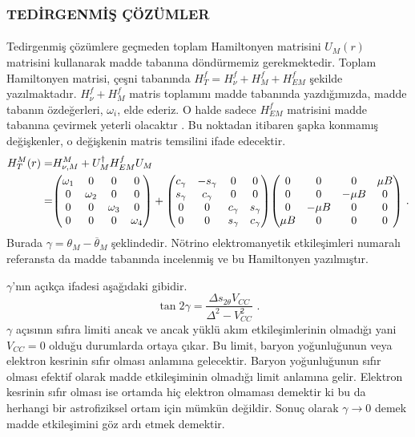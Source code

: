 \subsubsection{TEDİRGENMİŞ ÇÖZÜMLER}
\paragraph{}
Tedirgenmiş çözümlere geçmeden toplam Hamiltonyen matrisini $ U_{M}(r) $ matrisini kullanarak madde tabanına döndürmemiz gerekmektedir. Toplam Hamiltonyen matrisi, çeşni tabanında $ H^{f}_{T} = H^{f}_{\nu} + H^{f}_{M} + H^{f}_{EM} $ şekilde yazılmaktadır. $  H^{f}_{\nu} + H^{f}_{M} $ matris toplamını madde tabanında yazdığımızda, madde tabanın özdeğerleri, $ \omega_{i} $, elde ederiz. O halde sadece $ H^{f}_{EM} $ matrisini madde tabanına çevirmek yeterli olacaktır \cite{Friedland:2005xh}. Bu noktadan itibaren şapka konmamış değişkenler, o değişkenin matris temsilini ifade edecektir.
\begin{align} \label{eqn:Hamiltonyen_withGamma}
	\nonumber H^{M}_{T}(r) =& H^{M}_{\nu,M} + U^{\dagger}_{M} H^{f}_{EM} U_{M} \\
	=& \mqty(\omega_{1} & 0 & 0 & 0\\0 & \omega_{2} & 0 & 0\\0 & 0 & \omega_{3} & 0\\0 & 0 & 0 & \omega_{4}) + \mqty(c_{\gamma} & -s_{\gamma} & 0 & 0\\s_{\gamma} & c_{\gamma} & 0 & 0\\0 & 0 & c_{\gamma} & s_{\gamma}\\0 & 0 & s_{\gamma} & c_{\gamma})\mqty(0&0&0&\mu B\\0&0&-\mu B&0\\0&-\mu B&0&0\\\mu B&0&0&0) \text{ .}
\end{align}
Burada $ \gamma=\theta_{M}-\overline{\theta}_{M} $ şeklindedir. Nötrino elektromanyetik etkileşimleri \cite{Friedland:2005xh} numaralı referansta da madde tabanında incelenmiş ve bu Hamiltonyen yazılmıştır. 

$ \gamma $'nın açıkça ifadesi aşağıdaki gibidir.
\begin{equation}
	\tan 2\gamma = \frac{\Delta s_{2\theta} V_{CC}}{\Delta^{2} - V^{2}_{CC}} \text{ .}
\end{equation}
$ \gamma $ açısının sıfıra limiti ancak ve ancak yüklü akım etkileşimlerinin olmadığı yani $ V_{CC} = 0 $ olduğu durumlarda ortaya çıkar. Bu limit, baryon yoğunluğunun veya elektron kesrinin sıfır olması anlamına gelecektir. Baryon yoğunluğunun sıfır olması efektif olarak madde etkileşiminin olmadığı limit anlamına gelir. Elektron kesrinin sıfır olması ise ortamda hiç elektron olmaması demektir ki bu da herhangi bir astrofiziksel ortam için mümkün değildir. Sonuç olarak $ \gamma \rightarrow 0 $ demek madde etkileşimini göz ardı etmek demektir.

